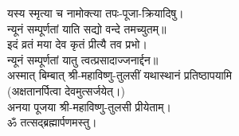 यस्य स्मृत्या च नामोक्त्या तपः-पूजा-क्रियादिषु।\\
न्यूनं सम्पूर्णतां याति सद्यो वन्दे तमच्युतम्॥\\
इदं व्रतं मया देव कृतं प्रीत्यै तव प्रभो।\\
न्यूनं सम्पूर्णतां यातु त्वत्प्रसादाज्जनार्द्दन॥\\

अस्मात् बिम्बात् श्री-महाविष्णु-तुलसीं यथास्थानं प्रतिष्ठापयामि\\
(अक्षतानर्पित्वा देवमुत्सर्जयेत्।)\\
अनया पूजया श्री-महाविष्णु-तुलसी प्रीयेताम्।\\
ॐ तत्सद्ब्रह्मार्पणमस्तु।